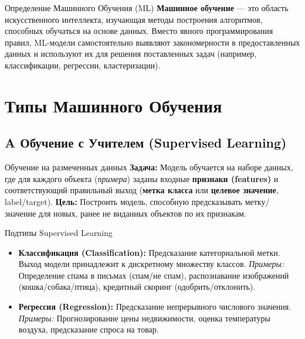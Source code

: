 
\begin{textbox}{Определение Машинного Обучения (ML)}
    \textbf{Машинное обучение} — это область искусственного интеллекта, изучающая методы построения алгоритмов, способных обучаться на основе данных. Вместо явного программирования правил, ML-модели самостоятельно выявляют закономерности в предоставленных данных и используют их для решения поставленных задач (например, классификации, регрессии, кластеризации).
\end{textbox}

\section{Типы Машинного Обучения}

\subsection{A Обучение с Учителем (Supervised Learning)}
\begin{myblock}{Обучение на размеченных данных}
    \textbf{Задача:} Модель обучается на наборе данных, где для каждого объекта (\textit{примера}) заданы входные \textbf{признаки (features)} и соответствующий правильный выход (\textbf{метка класса} или \textbf{целевое значение}, label/target).
    \textbf{Цель:} Построить модель, способную предсказывать метку/значение для новых, ранее не виданных объектов по их признакам.
\end{myblock}

\begin{myexampleblock}{Подтипы Supervised Learning}
    \begin{itemize}[nosep, leftmargin=*]
        \item \textbf{Классификация (Classification):} Предсказание категориальной метки. Выход модели принадлежит к дискретному множеству классов.
            \textit{Примеры:} Определение спама в письмах (спам/не спам), распознавание изображений (кошка/собака/птица), кредитный скоринг (одобрить/отклонить).
        \item \textbf{Регрессия (Regression):} Предсказание непрерывного числового значения.
            \textit{Примеры:} Прогнозирование цены недвижимости, оценка температуры воздуха, предсказание спроса на товар.
    \end{itemize}
\end{myexampleblock}

